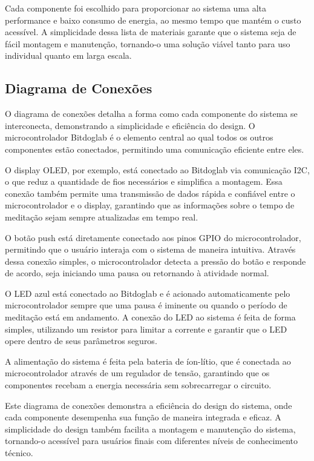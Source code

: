 \documentclass{article}
\begin{document}
Cada componente foi escolhido para proporcionar ao sistema uma alta performance e baixo consumo de energia, ao mesmo tempo que mantém o custo acessível. A simplicidade dessa lista de materiais garante que o sistema seja de fácil montagem e manutenção, tornando-o uma solução viável tanto para uso individual quanto em larga escala.

\subsection{Diagrama de Conexões}

O diagrama de conexões detalha a forma como cada componente do sistema se interconecta, demonstrando a simplicidade e eficiência do design. O microcontrolador Bitdoglab é o elemento central ao qual todos os outros componentes estão conectados, permitindo uma comunicação eficiente entre eles.

O display OLED, por exemplo, está conectado ao Bitdoglab via comunicação I2C, o que reduz a quantidade de fios necessários e simplifica a montagem. Essa conexão também permite uma transmissão de dados rápida e confiável entre o microcontrolador e o display, garantindo que as informações sobre o tempo de meditação sejam sempre atualizadas em tempo real.

O botão push está diretamente conectado aos pinos GPIO do microcontrolador, permitindo que o usuário interaja com o sistema de maneira intuitiva. Através dessa conexão simples, o microcontrolador detecta a pressão do botão e responde de acordo, seja iniciando uma pausa ou retornando à atividade normal.

O LED azul está conectado ao Bitdoglab e é acionado automaticamente pelo microcontrolador sempre que uma pausa é iminente ou quando o período de meditação está em andamento. A conexão do LED ao sistema é feita de forma simples, utilizando um resistor para limitar a corrente e garantir que o LED opere dentro de seus parâmetros seguros.

A alimentação do sistema é feita pela bateria de íon-lítio, que é conectada ao microcontrolador através de um regulador de tensão, garantindo que os componentes recebam a energia necessária sem sobrecarregar o circuito.

Este diagrama de conexões demonstra a eficiência do design do sistema, onde cada componente desempenha sua função de maneira integrada e eficaz. A simplicidade do design também facilita a montagem e manutenção do sistema, tornando-o acessível para usuários finais com diferentes níveis de conhecimento técnico.
\end{document}
